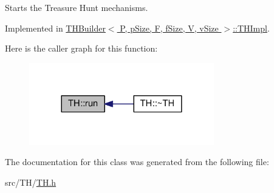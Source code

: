 Starts the Treasure Hunt mechanisms. 



Implemented in \hyperlink{classTHBuilder_1_1THImpl_a943301db5154fd7b672119b5c9917303}{T\+H\+Builder$<$ P, p\+Size, F, f\+Size, V, v\+Size $>$\+::\+T\+H\+Impl}.



Here is the caller graph for this function\+:
\nopagebreak
\begin{figure}[H]
\begin{center}
\leavevmode
\includegraphics[width=228pt]{classTH_aa7b9b5ac83b57193d581f1bf1dfc7265_icgraph}
\end{center}
\end{figure}




The documentation for this class was generated from the following file\+:\begin{DoxyCompactItemize}
\item 
src/\+T\+H/\hyperlink{TH_8h}{T\+H.\+h}\end{DoxyCompactItemize}
